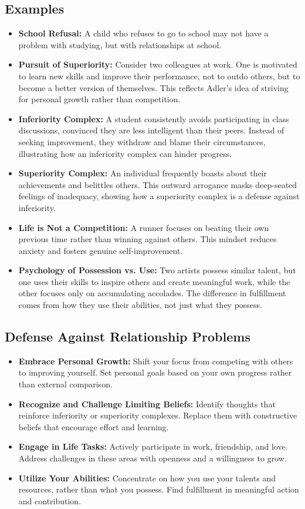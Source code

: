 \subsection*{Examples}
\begin{itemize}
    \item \textbf{School Refusal:} A child who refuses to go to school may not have a problem with studying, but with relationships at school.
    \item \textbf{Pursuit of Superiority:} Consider two colleagues at work. One is motivated to learn new skills and improve their performance, not to outdo others, but to become a better version of themselves. This reflects Adler’s idea of striving for personal growth rather than competition.
    \item \textbf{Inferiority Complex:} A student consistently avoids participating in class discussions, convinced they are less intelligent than their peers. Instead of seeking improvement, they withdraw and blame their circumstances, illustrating how an inferiority complex can hinder progress.
    \item \textbf{Superiority Complex:} An individual frequently boasts about their achievements and belittles others. This outward arrogance masks deep-seated feelings of inadequacy, showing how a superiority complex is a defense against inferiority.
    \item \textbf{Life is Not a Competition:} A runner focuses on beating their own previous time rather than winning against others. This mindset reduces anxiety and fosters genuine self-improvement.
    \item \textbf{Psychology of Possession vs. Use:} Two artists possess similar talent, but one uses their skills to inspire others and create meaningful work, while the other focuses only on accumulating accolades. The difference in fulfillment comes from how they use their abilities, not just what they possess.
\end{itemize}

\subsection*{Defense Against Relationship Problems}
\begin{itemize}
    \item \textbf{Embrace Personal Growth:} Shift your focus from competing with others to improving yourself. Set personal goals based on your own progress rather than external comparison.
    \item \textbf{Recognize and Challenge Limiting Beliefs:} Identify thoughts that reinforce inferiority or superiority complexes. Replace them with constructive beliefs that encourage effort and learning.
    \item \textbf{Engage in Life Tasks:} Actively participate in work, friendship, and love. Address challenges in these areas with openness and a willingness to grow.
    \item \textbf{Utilize Your Abilities:} Concentrate on how you use your talents and resources, rather than what you possess. Find fulfillment in meaningful action and contribution.
\end{itemize}

